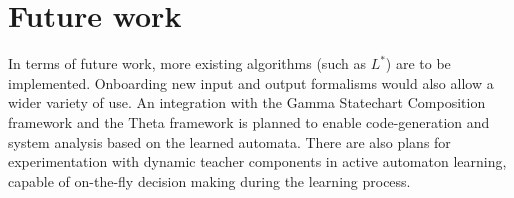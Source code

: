 \section{Future work}
In terms of future work, more existing algorithms (such as $L^*$) are to be implemented. Onboarding new input and output formalisms would also allow a wider variety of use.  An integration with the Gamma Statechart Composition framework\cite{DBLP:conf/icse/MolnarGVMV18} and the Theta framework\cite{theta-fmcad2017} is planned to enable code-generation and system analysis based on the learned automata. There are also plans for experimentation with dynamic teacher components in active automaton learning, capable of on-the-fly decision making during the learning process.